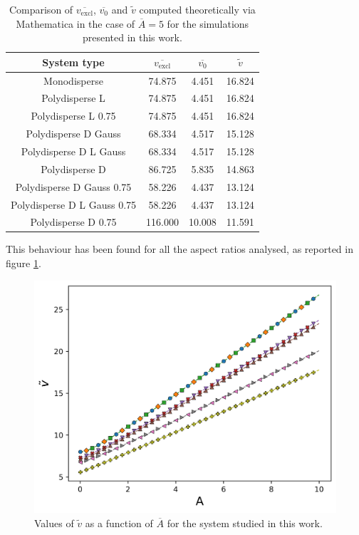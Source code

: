 \documentclass[journal=jacsat,manuscript=article]{achemso}
\begin{document}
\begin{table}
	\begin{tabular} { | c | c | c | c | }
		\hline 
		System type& $\overline{v_\mathrm{excl}}$ & $\overline{v_0}$ & $\tilde{v}$ \\
		\hline
		Monodisperse & 74.875 & 4.451 &  16.824 \\
		\hline
		Polydisperse L & 74.875 & 4.451 & 16.824  \\
		\hline
		Polydisperse L 0.75 & 74.875 & 4.451 & 16.824 \\
		\hline
		Polydisperse D Gauss & 68.334 & 4.517 & 15.128 \\
		\hline
		Polydisperse D L Gauss & 68.334 & 4.517 & 15.128 \\
		\hline
		Polydisperse D & 86.725 & 5.835 & 14.863 \\ 
		\hline
		Polydisperse D Gauss 0.75 & 58.226 & 4.437 & 13.124 \\
		\hline
		Polydisperse D L Gauss 0.75 & 58.226 & 4.437 & 13.124 \\
		\hline
		Polydisperse D 0.75 & 116.000 & 10.008 & 11.591 \\
		\hline
	\end{tabular}
	\caption{\label{tab:vtilde} Comparison of $\overline{v_\mathrm{excl}}$, $\overline{v_0}$ and $\tilde{v}$ computed theoretically via Mathematica in the case of $\overline{A} = 5$ for the simulations presented in this work.}
\end{table}

This behaviour has been found for all the aspect ratios analysed, as reported in figure \ref{fig:vtilde}.

\begin{figure}[!h]
	\centering
	\includegraphics[width=0.9 \columnwidth]{Figures/vtilde.png}
	\caption{Values of $\tilde{v}$ as a function of $\overline{A}$ for the system studied in this work.}
	\label{fig:vtilde}
\end{figure}
\end{document}
